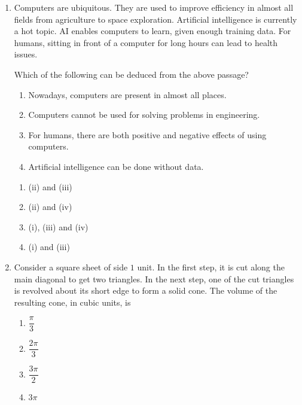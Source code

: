 \documentclass[journal,12pt,onecolumn]{IEEEtran}
\theoremstyle{remark}
\begin{document}
\begin{enumerate}
\item Computers are ubiquitous. They are used to improve efficiency in almost all fields from agriculture to space exploration. Artificial intelligence  is currently a hot topic. AI enables computers to learn, given enough training data. For humans, sitting in front of a computer for long hours can lead to health issues.  

Which of the following can be deduced from the above passage? 
\begin{enumerate}[label=(\roman*)]
    \item Nowadays, computers are present in almost all places.  
    \item Computers cannot be used for solving problems in engineering.
    \item For humans, there are both positive and negative effects of using computers. 
    \item Artificial intelligence can be done without data.
\end{enumerate}

\begin{multicols}{4}
\begin{enumerate}
\item (ii) and (iii)
\item (ii) and (iv)
\item (i), (iii) and (iv)
\item (i) and (iii)
\end{enumerate}
\end{multicols}
\hfill {}

\item Consider a square sheet of side $1$ unit. In the first step, it is cut along the main diagonal to get two triangles. In the next step, one of the cut triangles is revolved about its short edge to form a solid cone. The volume of the resulting cone, in cubic units, is
\begin{multicols}{4}
\begin{enumerate}
\item $\dfrac{\pi}{3}$
\item $\dfrac{2\pi}{3}$
\item $\dfrac{3\pi}{2}$
\item $3\pi$
\end{enumerate}
\end{multicols}
\hfill {}


\end{enumerate}
\end{document}
